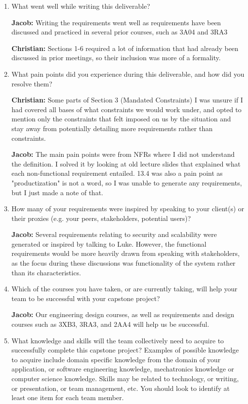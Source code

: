 \documentclass[12pt]{article}
\begin{document}
\begin{enumerate}
  \item What went well while writing this deliverable?
  
  \textbf{Jacob: } Writing the requirements went well as requirements have been discussed and practiced in several prior courses, such as 3A04 and 3RA3

  \textbf{Christian: } Sections 1-6 required a lot of information that had already been discussed in prior meetings, so their inclusion was more of a formality.

  \item What pain points did you experience during this deliverable, and how did you resolve them?

  \textbf{Christian: } Some parts of Section 3 (Mandated Constraints) I was unsure if I had covered all bases of what constraints we would work under, and opted to mention only the constraints that felt imposed on us by the situation and stay away from potentially detailing more requirements rather than constraints.

  \textbf{Jacob: } The main pain points were from NFRs where I did not understand the definition. I solved it by looking at old lecture slides that explained what each non-functional requirement entailed. 13.4 was also a pain point as "productization" is not a word, so I was unable to generate any requirements, but I just made a note of that.

  \item How many of your requirements were inspired by speaking to your
  client(s) or their proxies (e.g. your peers, stakeholders, potential users)?

  \textbf{Jacob: } Several requirements relating to security and scalability were generated or inspired by talking to Luke. However, the functional requirements would be more heavily drawn from speaking with stakeholders, as the focus during these discussions was functionality of the system rather than its characteristics.

  \item Which of the courses you have taken, or are currently taking, will help your team to be successful with your capstone project?
  
  \textbf{Jacob: } Our engineering design courses, as well as requirements and design courses such as 3XB3, 3RA3, and 2AA4 will help us be successful.

  \item What knowledge and skills will the team collectively need to acquire to
  successfully complete this capstone project?  Examples of possible knowledge
  to acquire include domain specific knowledge from the domain of your
  application, or software engineering knowledge, mechatronics knowledge or
  computer science knowledge.  Skills may be related to technology, or writing,
  or presentation, or team management, etc.  You should look to identify at
  least one item for each team member.\\


\end{enumerate}
\end{document}
